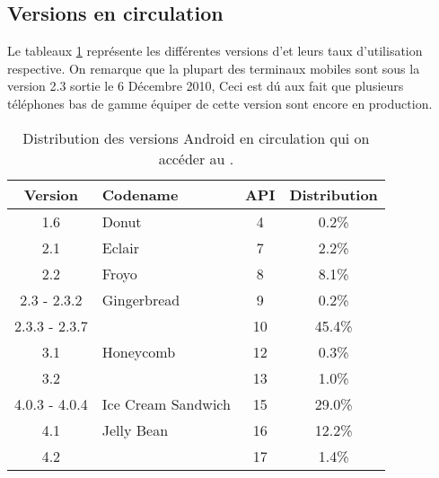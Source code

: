 \subsection{Versions \android en circulation}
Le tableaux \ref{tab:androidversion} représente les différentes versions d'\android et leurs taux d'utilisation respective. On remarque que la plupart des terminaux mobiles \android sont sous la version 2.3  sortie le 6 Décembre 2010, Ceci est dú aux fait que plusieurs téléphones bas de gamme équiper de cette version sont encore en production.

\begin{table}
\centering
\begin{tabular}{|c|l|c|c|}
\hline
\textbf{Version} & \textbf{Codename} & \textbf{API} & \textbf{Distribution}\\
\hline
1.6 & Donut & 4 & 0.2\%\\
\hline
2.1 & Eclair & 7 & 2.2\%\\
\hline
2.2 & Froyo & 8 & 8.1\%\\
\hline
2.3 - 2.3.2 & Gingerbread & 9 & 0.2\% \\
\cline{1-1}\cline{3-4}
2.3.3 - 2.3.7 & & 10 & 45.4\%\\
\hline
3.1 & Honeycomb & 12 & 0.3\%\\
\cline{1-1}\cline{3-4}
3.2 & & 13 & 1.0\%\\
\hline
4.0.3 - 4.0.4 & Ice Cream Sandwich & 15 & 29.0\%\\
\hline
4.1 & Jelly Bean & 16 & 12.2\%\\
\cline{1-1}\cline{3-4}
4.2 & & 17 & 1.4\%\\
\hline
\end{tabular}
\caption{Distribution des versions Android en circulation qui on accéder au .\protect\footnotemark[5]}
\label{tab:androidversion}
\end{table}

